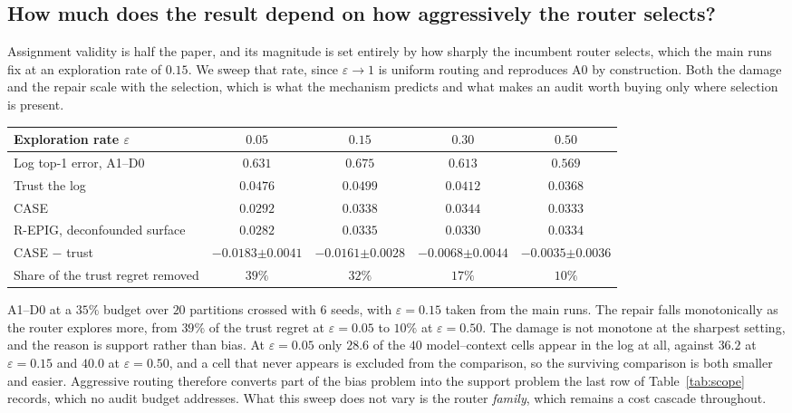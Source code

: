 \documentclass{article}
\theoremstyle{plain}
\theoremstyle{remark}
\newcommand{\se}[1]{{\scriptstyle\pm#1}}
\begin{document}
\subsection{How much does the result depend on how aggressively the router selects?}
Assignment validity is half the paper, and its magnitude is set entirely by how sharply the incumbent
router selects, which the main runs fix at an exploration rate of $0.15$. We sweep that rate, since
$\varepsilon\to1$ is uniform routing and reproduces A0 by construction. Both the damage and the
repair scale with the selection, which is what the mechanism predicts and what makes an audit worth
buying only where selection is present.

\begin{center}\footnotesize
\begin{tabular}{@{}lcccc@{}}
\toprule
Exploration rate $\varepsilon$ & $0.05$ & $0.15$ & $0.30$ & $0.50$\\
\midrule
Log top-1 error, A1--D0 & $0.631$ & $0.675$ & $0.613$ & $0.569$\\
Trust the log & $0.0476$ & $0.0499$ & $0.0412$ & $0.0368$\\
CASE & $0.0292$ & $0.0338$ & $0.0344$ & $0.0333$\\
R-EPIG, deconfounded surface & $0.0282$ & $0.0335$ & $0.0330$ & $0.0334$\\
\addlinespace[2pt]
CASE $-$ trust & $-0.0183\se{0.0041}$ & $-0.0161\se{0.0028}$ & $-0.0068\se{0.0044}$ & $-0.0035\se{0.0036}$\\
Share of the trust regret removed & $39\%$ & $32\%$ & $17\%$ & $10\%$\\
\bottomrule
\end{tabular}
\end{center}
\noindent A1--D0 at a $35\%$ budget over $20$ partitions crossed with $6$ seeds, with
$\varepsilon=0.15$ taken from the main runs. The repair falls monotonically as the router explores
more, from $39\%$ of the trust regret at $\varepsilon=0.05$ to $10\%$ at $\varepsilon=0.50$. The
damage is not monotone at the sharpest setting, and the reason is support rather than bias. At
$\varepsilon=0.05$ only $28.6$ of the $40$ model--context cells appear in the log at all, against
$36.2$ at $\varepsilon=0.15$ and $40.0$ at $\varepsilon=0.50$, and a cell that never appears is
excluded from the comparison, so the surviving comparison is both smaller and easier. Aggressive
routing therefore converts part of the bias problem into the support problem the last row of
Table~\ref{tab:scope} records, which no audit budget addresses. What this sweep does not vary is the
router \emph{family}, which remains a cost cascade throughout.
\end{document}
